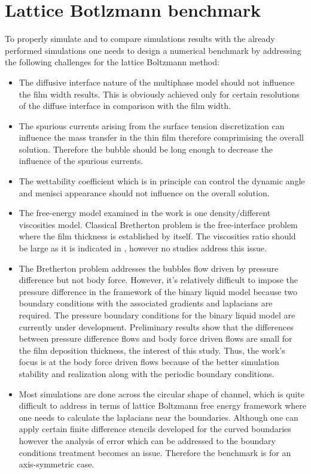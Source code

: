 \documentclass{article}
\begin{document}
\section{Lattice Botlzmann benchmark}
To properly simulate and to compare simulations results with the already
performed simulations one needs to design a numerical benchmark by addressing
the following challenges for the lattice Boltzmann method:
\begin{itemize}
 \item The diffusive interface nature of the multiphase model should not
influence the film width results. This is obviously achieved only for certain
resolutions of the diffuse interface in comparison with the film width.
 \item The spurious currents arising from the surface tension discretization
can influence the mass transfer in the thin film therefore comprimising the
overall solution. Therefore the bubble should be long enough to decrease the
influence of the spurious currents.
 \item The wettability coefficient which is in principle can control the
dynamic angle and menisci appearance \cite{pagonabarraga-finger} should not
influence on the overall solution.
 \item The free-energy model examined in the work is one density/different
viscosities model. Classical Bretherton problem is the free-interface problem
where the film thickness is established by itself. The viscosities ratio should
be large as it is indicated in \cite{pagonabarraga-fingers}, however no studies
address this issue.
  \item The Bretherton problem addresses the bubbles flow driven by pressure
difference but not body force. However, it's relatively difficult to impose the
pressure difference in the framework of the binary liquid model because two
boundary conditions with the associated gradients and laplacians are required.
The pressure boundary conditions for the binary liquid model are currently
under development. Preliminary results show that the differences between
pressure difference flows and body force driven flows are small for the film
deposition thickness, the interest of this study. Thus, the work's focus is at
the body force driven flows because of the better simulation stability and
realization along with the periodic boundary conditions.
 \item Most simulations are done across the circular shape of channel,
which is quite difficult to address in terms of lattice Boltzmann free energy
framework where one needs to calculate the laplacians near the boundaries.
Although one can apply certain finite difference stencils
\cite{arnold-boundary,hunt-boundary} developed for the curved boundaries
however the analysis of error which can be addressed to the boundary conditions
treatment becomes an issue. Therefore the benchmark is for an axis-symmetric
case. 
\end{itemize}
\end{document}
